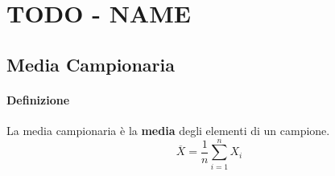 \documentclass[]{article}
\begin{document}
    \section{TODO - NAME}
    \subsection{Media Campionaria}
    \paragraph[short]{Definizione} La media campionaria è la \textbf{media} degli elementi di un campione.
    \centering \[ \overline{X} = \frac{1}{n} \sum_{i=1}^{n} X_i \]
\end{document}
